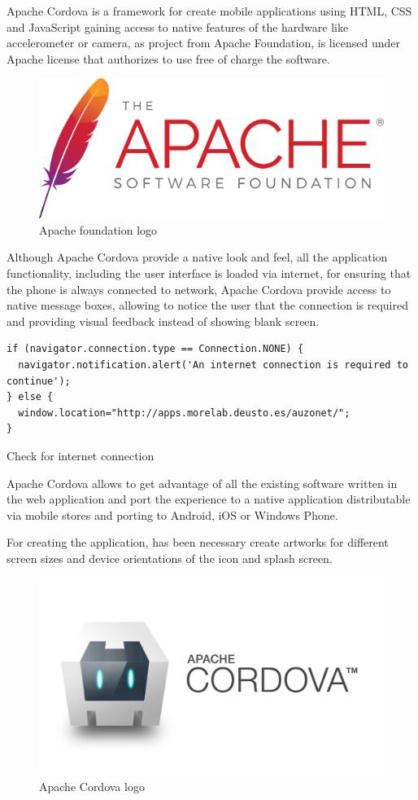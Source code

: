 \documentclass{DeustoFDP}
\begin{document}
Apache Cordova is a framework for create mobile applications using HTML, CSS and JavaScript gaining access to native features of the hardware like accelerometer or camera, as project from Apache Foundation, is licensed under Apache license that authorizes to use free of charge the software.

\begin{figure}[h]
\centering
\includegraphics[width=0.4\linewidth]{fig/apache}
\caption[Apache foundation logo]{Apache foundation logo}
\label{fig:apache}
\end{figure}

Although Apache Cordova provide a native look and feel, all the application functionality, including the user interface is loaded via internet, for ensuring that the phone is always connected to network, Apache Cordova provide access to native message boxes, allowing to notice the user that the connection is required and providing visual feedback instead of showing blank screen.

\begin{listing}[!h]\centering 
	\begin{minipage}{.9\textwidth}
		\begin{verbatim}
if (navigator.connection.type == Connection.NONE) {
  navigator.notification.alert('An internet connection is required to continue');
} else {
  window.location="http://apps.morelab.deusto.es/auzonet/";
}
		\end{verbatim}
	\end{minipage}
	\caption{Check for internet connection}\label{lst:internetcheck}
\end{listing}

Apache Cordova \cite{Cordova} allows to get advantage of all the existing software written in the web application and port the experience to a native application distributable via mobile stores and porting to Android, iOS or Windows Phone.

For creating the application, has been necessary create artworks for different screen sizes and device orientations of the icon and splash screen.

\begin{figure}[h]
\centering
\includegraphics[width=0.4\linewidth]{fig/cordova}
\caption[Apache Cordova logo]{Apache Cordova logo}
\label{fig:cordova}
\end{figure}
\end{document}
